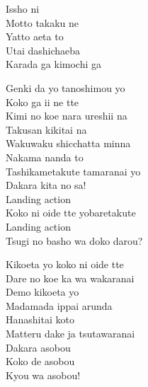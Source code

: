 \begin{multicols}{2}
Issho ni \\
Motto takaku ne \\
Yatto aeta to\\
Utai dashichaeba\\
Karada ga kimochi ga \\


Genki da yo tanoshimou yo\\
Koko ga ii ne tte\\
Kimi no koe nara ureshii na\\
Takusan kikitai na\\
Wakuwaku shicchatta minna\\
Nakama nanda to\\
Tashikametakute tamaranai yo\\
Dakara kita no sa!\\

Landing action\\
Koko ni oide tte yobaretakute\\
Landing action\\
Tsugi no basho wa doko darou?\\


Kikoeta yo koko ni oide tte\\
Dare no koe ka wa wakaranai\\
Demo kikoeta yo\\
Madamada ippai arunda\\
Hanashitai koto\\
Matteru dake ja tsutawaranai\\
Dakara asobou\\
Koko de asobou\\
Kyou wa asobou!\\
\end{multicols}

\ifdefined\COMPLETE
\else
	
\fi
